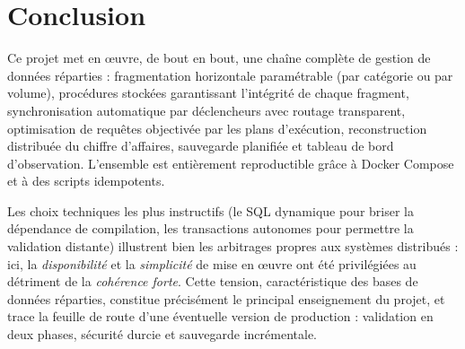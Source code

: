 \documentclass[11pt,a4paper]{article}
\begin{document}
\section{Conclusion}

Ce projet met en œuvre, de bout en bout, une chaîne complète de gestion de
données réparties : fragmentation horizontale paramétrable (par catégorie ou par
volume), procédures stockées garantissant l'intégrité de chaque fragment,
synchronisation automatique par déclencheurs avec routage transparent,
optimisation de requêtes objectivée par les plans d'exécution, reconstruction
distribuée du chiffre d'affaires, sauvegarde planifiée et tableau de bord
d'observation. L'ensemble est entièrement reproductible grâce à Docker Compose
et à des scripts idempotents.

Les choix techniques les plus instructifs (le SQL dynamique pour briser la
dépendance de compilation, les transactions autonomes pour permettre la
validation distante) illustrent bien les arbitrages propres aux systèmes
distribués : ici, la \emph{disponibilité} et la \emph{simplicité} de mise en
œuvre ont été privilégiées au détriment de la \emph{cohérence forte}. Cette
tension, caractéristique des bases de données réparties, constitue précisément
le principal enseignement du projet, et trace la feuille de route d'une
éventuelle version de production : validation en deux phases, sécurité durcie et
sauvegarde incrémentale.
\end{document}

